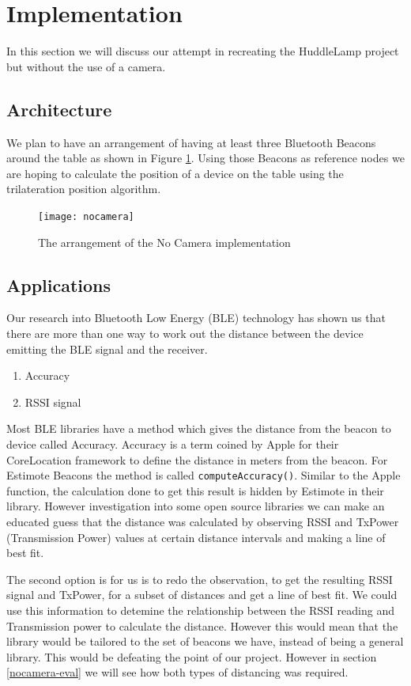 \section{Implementation}

In this section we will discuss our attempt in recreating the HuddleLamp project but without the use of a camera. 


\subsection{Architecture} \label{nocamer_architecture}

We plan to have an arrangement of having at least three Bluetooth Beacons around the table as shown in Figure \ref{fig:nocamera}. Using those Beacons as reference nodes we are hoping to calculate the position of a device on the table using the trilateration position algorithm.
 
 \begin{figure}
 \centering
 \texttt{[image: nocamera]}
 \caption{The arrangement of the No Camera implementation}
 \label{fig:nocamera}
 \end{figure}

\subsection{Applications}
Our research into Bluetooth Low Energy (BLE) technology has shown us that there are more than one way to work out the distance between the device emitting the BLE signal and the receiver. 
\begin{enumerate}
\item Accuracy
\item RSSI signal
\end{enumerate}
Most BLE libraries have a method which gives the distance from the beacon to device called Accuracy. Accuracy is a term coined by Apple for their CoreLocation framework to define the distance in meters from the beacon. For Estimote Beacons the method is called  \lstinline|computeAccuracy()|. Similar to the Apple function, the calculation done to get this result is hidden by Estimote in their library. However investigation into some open source libraries \cite{radius-ranging, android_ibeacon_alt} we can make an educated guess that the distance was calculated by observing RSSI and TxPower (Transmission Power) values at certain distance intervals and making a line of best fit.

The second option is for us is to redo the observation, to get the resulting RSSI signal and TxPower, for a subset of distances and get a line of best fit. We could use this information to detemine the relationship between the RSSI reading and Transmission power to calculate the distance. However this would mean that the library would be tailored to the set of beacons we have, instead of being a general library. This would be defeating the point of our project. However in section \ref{nocamera-eval} we will see how both types of distancing was required.

